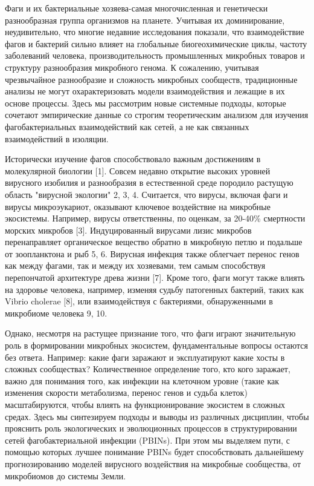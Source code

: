 \documentclass[a4paper,12pt]{article}
\begin{document}
    \par{Фаги и их бактериальные хозяева-самая многочисленная и генетически разнообразная группа организмов на планете.
    Учитывая их доминирование, неудивительно, что многие недавние исследования показали, что взаимодействие фагов и
    бактерий сильно влияет на глобальные биогеохимические циклы, частоту заболеваний человека, производительность
    промышленных микробных товаров и структуру разнообразия микробного генома. К сожалению, учитывая чрезвычайное
    разнообразие и сложность микробных сообществ, традиционные анализы не могут охарактеризовать модели взаимодействия
    и лежащие в их основе процессы. Здесь мы рассмотрим новые системные подходы, которые сочетают эмпирические данные
    со строгим теоретическим анализом для изучения фагобактериальных взаимодействий как сетей, а не как связанных
    взаимодействий в изоляции.}
    
    \par{Исторически изучение фагов способствовало важным достижениям в молекулярной биологии [1]. Совсем недавно
    открытие высоких уровней вирусного изобилия и разнообразия в естественной среде породило растущую область "вирусной
    экологии" 2, 3, 4. Считается, что вирусы, включая фаги и вирусы микроэукариот, оказывают ключевое воздействие на
    микробные экосистемы. Например, вирусы ответственны, по оценкам, за 20-40\% смертности морских микробов [3].
    Индуцированный вирусами лизис микробов перенаправляет органическое вещество обратно в микробную петлю и подальше от
    зоопланктона и рыб 5, 6. Вирусная инфекция также облегчает перенос генов как между фагами, так и между их
    хозяевами, тем самым способствуя перепончатой архитектуре древа жизни [7]. Кроме того, фаги могут также влиять на
    здоровье человека, например, изменяя судьбу патогенных бактерий, таких как Vibrio cholerae [8], или взаимодействуя
    с бактериями, обнаруженными в микробиоме человека 9, 10.}
    
    \par{Однако, несмотря на растущее признание того, что фаги играют значительную роль в формировании микробных
    экосистем, фундаментальные вопросы остаются без ответа. Например: какие фаги заражают и эксплуатируют какие хосты в
    сложных сообществах? Количественное определение того, кто кого заражает, важно для понимания того, как инфекции на
    клеточном уровне (такие как изменения скорости метаболизма, перенос генов и судьба клеток) масштабируются, чтобы
    влиять на функционирование экосистем в сложных средах. Здесь мы синтезируем подходы и выводы из различных
    дисциплин, чтобы прояснить роль экологических и эволюционных процессов в структурировании сетей фагобактериальной
    инфекции (PBINs). При этом мы выделяем пути, с помощью которых лучшее понимание PBINs будет способствовать
    дальнейшему прогнозированию моделей вирусного воздействия на микробные сообщества, от микробиомов до системы
    Земли.}
    
\end{document}
